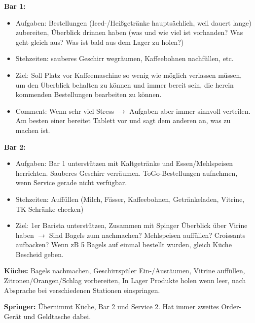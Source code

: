 \documentclass[a4paper,12pt]{article}
\newcounter{row}
\begin{document}
\textbf{Bar 1:}
\begin{itemize}[topsep=0pt, itemsep=0pt]
    \item[] Aufgaben:
    Bestellungen (Iced-/Heißgetränke hauptsächlich, weil dauert lange) zubereiten, Überblick drinnen haben (was und wie viel ist vorhanden? Was geht gleich aus? Was ist bald aus dem Lager zu holen?)
    \item[] Stehzeiten: 
    sauberes Geschirr wegräumen, Kaffeebohnen nachfüllen, etc.
    \item[] Ziel:
    Soll Platz vor Kaffeemaschine so wenig wie möglich verlassen müssen, um den Überblick behalten zu können und immer bereit sein, die herein kommenden Bestellungen bearbeiten zu können.
    \item[] Comment:
    Wenn sehr viel Stress $\rightarrow$ Aufgaben aber immer sinnvoll verteilen. Am besten einer bereitet Tablett vor und sagt dem anderen an, was zu machen ist.
\end{itemize}
\vspace{1em}

\textbf{Bar 2:}
\begin{itemize}[topsep=0pt, itemsep=0pt]
    \item[] Aufgaben:
    Bar 1 unterstützen mit Kaltgetränke und Essen/Mehlspeisen herrichten. Sauberes Geschirr verräumen. ToGo-Bestellungen aufnehmen, wenn Service gerade nicht verfügbar.
    \item[] Stehzeiten:
    Auffüllen (Milch, Fässer, Kaffeebohnen, Getränkeladen, Vitrine, TK-Schränke checken)
    \item[] Ziel: 1er Barista unterstützen, Zusammen mit Spinger Überblick über Virine haben $\rightarrow$ Sind Bagels zum nachmachen? Mehlspeisen auffüllen? Croissants aufbacken? Wenn zB 5 Bagels auf einmal bestellt wurden, gleich Küche Bescheid geben.
\end{itemize}
\vspace{1em}

\textbf{Küche:}
Bagels nachmachen, Geschirrspüler Ein-/Ausräumen, Vitrine auffüllen, Zitronen/Orangen/Schlag vorbereiten, In Lager Produkte holen wenn leer, nach Absprache bei verschiedenen Stationen einspringen.
\vspace{1em}

\textbf{Springer:}
Übernimmt Küche, Bar 2 und Service 2. Hat immer zweites Order-Gerät und Geldtasche dabei.

\end{document}
